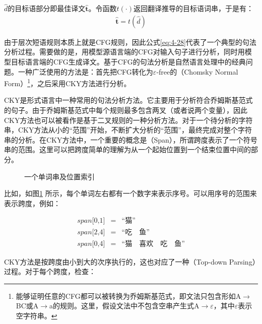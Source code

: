 \parinterval $\hat{d}$的目标语部分即最佳译文$\hat{\mathbf{t}}$。令函数$t(\cdot)$返回翻译推导的目标语词串，于是有：
\begin{eqnarray}
\hat{\mathbf{t}}=t(\hat{d})
\label{eq:4-29}
\end{eqnarray}

\parinterval 由于层次短语规则本质上就是CFG规则，因此公式\ref{eq:4-28}代表了一个典型的句法分析过程。需要做的是，用模型源语言端的CFG对输入句子进行分析，同时用模型目标语言端的CFG生成译文。基于CFG的句法分析是自然语言处理中的经典问题。一种广泛使用的方法是：首先把CFG转化为$\varepsilon$-free的{\small{}}（Chomsky Normal Form）\footnote[5]{能够证明任意的CFG都可以被转换为乔姆斯基范式，即文法只包含形如A$\to$BC或A$\to$a的规则。这里，假设文法中不包含空串产生式A$\to\varepsilon$，其中$\varepsilon$表示空字符串。}，之后采用CKY方法进行分析。

\parinterval CKY是形式语言中一种常用的句法分析方法\cite{cocke1969programming,younger1967recognition,kasami1966efficient}。它主要用于分析符合乔姆斯基范式的句子。由于乔姆斯基范式中每个规则最多包含两叉（或者说两个变量），因此CKY方法也可以被看作是基于二叉规则的一种分析方法。对于一个待分析的字符串，CKY方法从小的``范围''开始，不断扩大分析的``范围''，最终完成对整个字符串的分析。在CKY方法中，一个重要的概念是{\small{}}（Span），所谓跨度表示了一个符号串的范围。这里可以把跨度简单的理解为从一个起始位置到一个结束位置中间的部分。

\begin{figure}[htp]
\centering

\caption{一个单词串及位置索引}
\label{fig:4-35}
\end{figure}

比如，如图\ref{fig:4-35} 所示，每个单词左右都有一个数字来表示序号。可以用序号的范围来表示跨度，例如：

\begin{eqnarray}
span\textrm{[0,1]}&=&\textrm{``猫''} \nonumber \\
span\textrm{[2,4]}&=&\textrm{``吃} \quad \textrm{鱼''} \nonumber \\
span\textrm{[0,4]}&=&\textrm{``猫} \quad \textrm{喜欢} \quad \textrm{吃} \quad \textrm{鱼''} \nonumber
\end{eqnarray}

\parinterval CKY方法是按跨度由小到大的次序执行的，这也对应了一种{\small{}}（Top-down Parsing）过程。对于每个跨度，检查：

